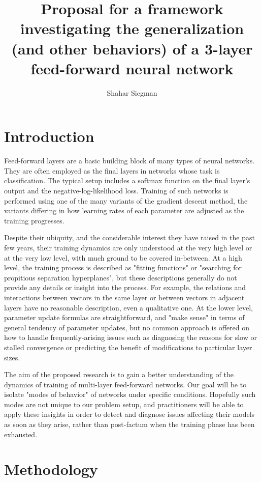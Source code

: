\documentclass[]{article}
\title{Proposal for a framework investigating the generalization (and other behaviors) of a 3-layer feed-forward neural network}
\author{Shahar Siegman}
\begin{document}
 	
 	\maketitle
 	
 	\section{Introduction}
 		Feed-forward layers are a basic building block of many types of neural networks. They are often employed as the final layers in networks whose task is classification. The typical setup includes a softmax function on the final layer's output and the negative-log-likelihood loss. Training of such networks is performed using one of the many variants of the gradient descent method, the variants differing in how learning rates of each parameter are adjusted as the training progresses.
 		
 		Despite their ubiquity, and the considerable interest they have raised in the past few years, their training dynamics are only understood at the very high level or at the very low level, with much ground to be covered in-between. At a high level, the training process is described as "fitting functions" or "searching for propitious separation hyperplanes", but these descriptions generally  do not provide any details or insight into the process. For example, the relations and interactions between vectors in the same layer or between vectors in adjacent layers have no reasonable description, even a qualitative one. At the lower level, parameter update formulas are straightforward, and "make sense" in terms of general tendency of parameter updates, but no common approach is offered on how to handle frequently-arising issues such as diagnosing the reasons for slow or stalled convergence or predicting the benefit of modifications to particular layer sizes.
 		

		The aim of the proposed research is to gain a better understanding of the dynamics of training of multi-layer feed-forward networks. Our goal will be to isolate "modes of behavior" of networks under specific conditions. Hopefully such modes are not unique to our problem setup, and practitioners will be able to apply these insights in order to detect and diagnose issues affecting their models as soon as they arise, rather than post-factum when the training phase has been exhausted.

	\section{Methodology}
\end{document}
